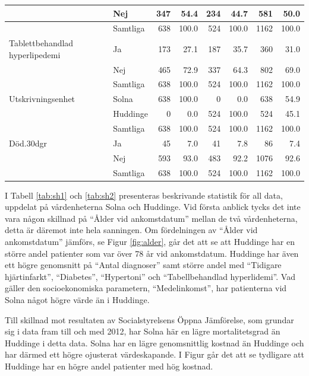 \begin{table}[htbp]
{\begin{tabular}{ll|rr|rr|rr}
   & Nej & 347 & 54.4 & 234 & 44.7 & 581 & 50.0 \\ 
   \hline
 & Samtliga & 638 & 100.0 & 524 & 100.0 & 1162 & 100.0 \\ 
   \hline
\hline
Tablettbehandlad hyperlipedemi & Ja & 173 & 27.1 & 187 & 35.7 & 360 & 31.0 \\ 
   & Nej & 465 & 72.9 & 337 & 64.3 & 802 & 69.0 \\ 
   \hline
 & Samtliga & 638 & 100.0 & 524 & 100.0 & 1162 & 100.0 \\ 
   \hline
\hline
Utskrivningsenhet & Solna & 638 & 100.0 & 0 & 0.0 & 638 & 54.9 \\ 
   & Huddinge & 0 & 0.0 & 524 & 100.0 & 524 & 45.1 \\ 
   \hline
 & Samtliga & 638 & 100.0 & 524 & 100.0 & 1162 & 100.0 \\ 
   \hline
\hline
Död.30dgr & Ja & 45 & 7.0 & 41 & 7.8 & 86 & 7.4 \\ 
   & Nej & 593 & 93.0 & 483 & 92.2 & 1076 & 92.6 \\ 
   \hline
 & Samtliga & 638 & 100.0 & 524 & 100.0 & 1162 & 100.0 \\ 
   \hline
\hline
\end{tabular}
}

\end{table}

\newpage

I Tabell \ref{tab:sh1} och \ref{tab:sh2} presenteras beskrivande statistik för all data, uppdelat på vårdenheterna Solna och Huddinge. Vid första anblick tycks det inte vara någon skillnad på “Ålder vid ankomstdatum” mellan de två vårdenheterna, detta är däremot inte hela sanningen. Om fördelningen av “Ålder vid ankomstdatum” jämförs, se Figur \ref{fig:alder}, går det att se att Huddinge har en större andel patienter som var över 78 år vid ankomstdatum. Huddinge har även ett högre genomsnitt på “Antal diagnoser” samt större andel med “Tidigare hjärtinfarkt”, “Diabetes”, “Hypertoni” och “Tabellbehandlad hyperlidemi”. Vad gäller den socioekonomiska parametern, ``Medelinkomst'', har patienterna vid Solna något högre värde än i Huddinge.

Till skillnad mot resultaten av Socialstyrelsens Öppna Jämförelse, som grundar sig i data fram till och med 2012, har Solna här en lägre mortalitetsgrad än Huddinge i detta data. Solna har en lägre genomsnittlig kostnad än Huddinge och har därmed ett högre ojusterat värdeskapande. I Figur \label{fig:kostnad} går det att se tydligare att Huddinge har en högre andel patienter med hög kostnad.

